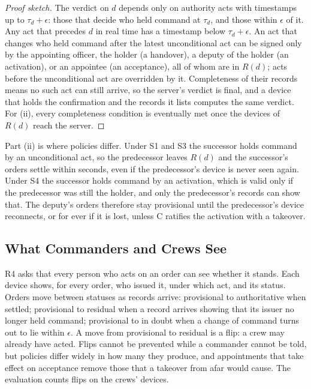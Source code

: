 \begin{proof}[Proof sketch]
The verdict on $d$ depends only on authority acts with timestamps up to $\tau_d + \epsilon$:
those that decide who held command at $\tau_d$, and those within $\epsilon$ of it. Any act
that precedes $d$ in real time has a timestamp below $\tau_d + \epsilon$. An act that changes
who held command after the latest unconditional act can be signed only by the appointing
officer, the holder (a handover), a deputy of the holder (an activation), or an appointee
(an acceptance), all of whom are in $R(d)$; acts before the unconditional act are overridden
by it. Completeness of their records means no such act can still arrive, so the server's
verdict is final, and a device that holds the confirmation and the records it lists computes
the same verdict. For (ii), every completeness condition is eventually met once the devices
of $R(d)$ reach the server.
\end{proof}

Part (ii) is where policies differ. Under S1 and S3 the successor holds command by an
unconditional act, so the predecessor leaves $R(d)$ and the successor's orders settle
within seconds, even if the predecessor's device is never seen again. Under S4 the
successor holds command by an activation, which is valid only if the predecessor was still
the holder, and only the predecessor's records can show that. The deputy's orders therefore
stay provisional until the predecessor's device reconnects, or for ever if it is lost,
unless C ratifies the activation with a takeover. 

\subsection{What Commanders and Crews See}
\label{sec:readers}

R4 asks that every person who acts on an order can see whether it stands. Each device shows,
for every order, who issued it, under which act, and its status. Orders move between
statuses as records arrive: provisional to authoritative when settled; provisional to
residual when a record arrives showing that its issuer no longer held command; provisional
to in doubt when a change of command turns out to lie within $\epsilon$. A move from
provisional to residual is a flip: a crew may already have acted. Flips cannot be prevented
while a commander cannot be told, but policies differ widely in how many they produce, and
appointments that take effect on acceptance remove those that a takeover from afar
would cause. The evaluation counts flips on the crews' devices.
